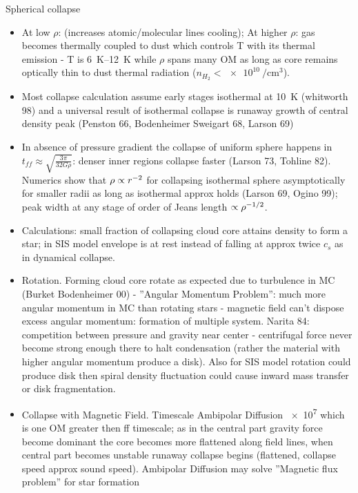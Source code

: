 \begin{frame}{Spherical collapse}
    \begin{itemize}
        \item At low $\rho$: \xaumenta{\rho}  (increases atomic/molecular lines cooling); At higher $\rho$: gas becomes thermally coupled to dust which controls T with its thermal emission - T is \SIrange{6}{12}{\kelvin} while $\rho$ spans many OM as long as core remains optically thin to dust thermal radiation ($n_{H_2}<\SI{e10}{\per\cubic\cm}$).
        \item Most collapse calculation assume early stages isothermal at \SI{10}{\kelvin} (whitworth 98) and a universal result of isothermal collapse is runaway growth of central density peak (Penston 66, Bodenheimer Sweigart 68, Larson 69)
        \item In absence of pressure gradient the collapse of uniform sphere happens in $t_{ff}\approx\sqrt{\frac{3\pi}{32G\rho}}$: denser inner regions collapse faster (Larson 73, Tohline 82). Numerics show that $\rho\propto r^{-2}$ for collapsing isothermal sphere asymptotically for smaller radii as long as isothermal approx holds (Larson 69, Ogino 99); peak width at any stage of order of Jeans length $\propto\rho^{-1/2}$.
        \item Calculations: small fraction of collapsing cloud core attains density to form a star; in SIS model envelope is at rest instead of falling at approx twice $c_s$ as in dynamical collapse.
        \item Rotation. Forming cloud core rotate as expected due to turbulence in MC (Burket Bodenheimer 00) - ''Angular Momentum Problem'': much more angular momentum in MC than rotating stars - magnetic field can't dispose excess angular momentum: formation of multiple system. Narita 84: competition between pressure and gravity near center - centrifugal force never become strong enough there to halt condensation (rather the material with higher angular momentum produce a disk). Also for SIS model rotation could produce disk then spiral density fluctuation could cause inward mass transfer or disk fragmentation.
        \item Collapse with Magnetic Field. Timescale Ambipolar Diffusion \SI{e7}{\year} which is one OM greater then ff timescale; as in the central part gravity force become dominant the core becomes more flattened along field lines, when central part becomes unstable runaway collapse begins (flattened, collapse speed approx sound speed). Ambipolar Diffusion may solve ''Magnetic flux problem'' for star formation

    \end{itemize}
\end{frame}

